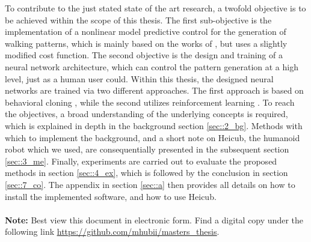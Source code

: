 To contribute to the just stated state of the art research, a twofold objective is to be achieved within the scope of this thesis. The first sub-objective is the implementation of a nonlinear model predictive control for the generation of walking patterns, which is mainly based on the works of \cite{naveau2016reactive}, but uses a slightly modified cost function. The second objective is the design and training of a neural network architecture, which can control the pattern generation at a high level, just as a human user could. Within this thesis, the designed neural networks are trained via two different approaches. The first approach is based on behavioral cloning \cite{bojarski2016end}, while the second utilizes reinforcement learning \cite{schulman2017proximal}. To reach the objectives, a broad understanding of the underlying concepts is required, which is explained in depth in the background section \ref{sec::2_bg}. Methods with which to implement the background, and a short note on Heicub, the humanoid robot which we used, are consequentially presented in the subsequent section \ref{sec::3_me}. Finally, experiments are carried out to evaluate the proposed methods in section \ref{sec::4_ex}, which is followed by the conclusion in section \ref{sec::7_co}. The appendix in section \ref{sec::a} then provides all details on how to install the implemented software, and how to use Heicub.
\\\\
\textbf{Note:} Best view this document in electronic form. Find a digital copy under the following link \href{https://github.com/mhubii/masters_thesis}{\underline{https://github.com/mhubii/masters\_thesis}}.
